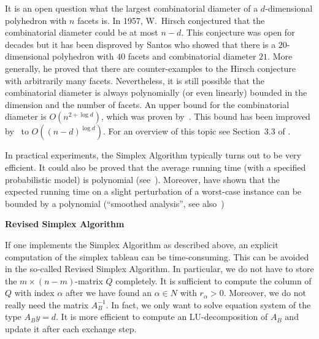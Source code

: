 \documentclass[12pt, showidx, twoside]{article}
\def\hi{\bf}
\begin{document}
{{{It is an open question what the largest combinatorial diameter of a $d$-dimensional
polyhedron with $n$ facets is. In 1957, W.\ Hirsch conjectured that the combinatorial
diameter could be at most $n-d$. This conjecture was open for decades but it has been
disproved by Santos \cite{San11} who showed that there is a $20$-dimensional 
polyhedron with $40$ facets and combinatorial diameter $21$.
More generally, he proved that there are counter-examples to the 
Hirsch conjecture with arbitrarily many facets.
Nevertheless, it is still possible that the combinatorial diameter is always
polynomially (or even linearly) bounded in the dimension and the number of facets.
An upper bound for the combinatorial diameter is $O(n^{2 + \log d })$,
which was proven by~\cite{KalK92}. 
This bound has been improved by~\cite{Tod14} to $O((n-d)^{\log d })$.
For an overview of this topic see Section~3.3 of \cite{Zie07}.



In practical experiments, the {\sc Simplex Algorithm} typically turns 
out to be very efficient.
It could also be proved that the average running time (with a
specified probabilistic model) is polynomial (see~\cite{Bor82}).
Moreover, \cite{SpiT05} have shown that the expected running time
on a slight perturbation of a worst-case instance can be bounded by
a polynomial (``smoothed analysis'', see also~\cite{DadH19})

\bigskip

{\bf Revised Simplex Algorithm}

If one implements the {\sc Simplex Algorithm} as described above, an
explicit computation of the simplex tableau can be time-consuming.
This can be avoided in the so-called 
{\sc Revised Simplex Algorithm}{}.
In particular, we do not have to store the $m \times (n-m)$-matrix $Q$ completely.
It is sufficient to compute the column of $Q$ with index $\alpha$
after we have found an $\alpha \in N$ with $r_\alpha > 0$. %
Moreover, we do not really need the matrix $A_B^{-1}$. In fact, we only
want to solve equation system of the type $A_B y = d$. It is more efficient
to compute an LU-decomposition of $A_B$ and update it after each exchange step.









}}}
\end{document}
